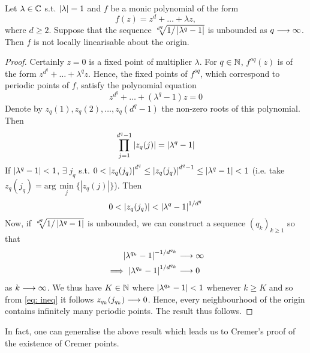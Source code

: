 \documentclass[../main.tex]{subfiles}
\begin{document}
\begin{lem}\label{Cremlem}
Let $\lambda \in \mathbb{C}$ s.t. $\left|\lambda\right| = 1$ and $f$ be a monic polynomial of the form
\[
f(z) = z^{d} + \dots + \lambda z,
\]
where $d \geq 2$.  Suppose that the sequence $\sqrt[d^{q}]{1 / \left|\lambda^q - 1\right|}$ is unbounded as $q \longrightarrow \infty$. Then $f$ is not locally linearisable about the origin.
\end{lem}
\begin{proof}
Certainly $z = 0$ is a fixed point of multiplier $\lambda$. For $q \in \mathbb{N}$, $f^{oq}(z)$ is of the form $z^{d^{q}} + \dots + \lambda^{q} z$. Hence, the fixed points of $f^{oq}$, which correspond to periodic points of $f$, satisfy the polynomial equation
\[
z^{d^{q}} + \dots + (\lambda^{q} - 1)z = 0
\]
Denote by $z_{q}(1), z_{q}(2), \dots, z_{q}(d^{q} - 1)$ the non-zero roots of this polynomial. Then 
\[
\prod_{j = 1}^{d^{q}-1} \left|{ z_{q}{(j)}}\right| = \left|\lambda^{q} - 1\right|
\]
If $\left|\lambda^{q} - 1\right| < 1$, $\exists\; j_{q}$\; s.t. $0 < \left|z_{q}(j_q)\right|^{d^{q}} \leq\left|z_{q}(j_q)\right|^{d^{q}-1} \leq \left|\lambda^{q} - 1\right| < 1$ (i.e. take $z_{q}(j_q) = \text{arg}\,\min\limits_{j}\{\left|z_{q}(j)\right|\}$). Then 
\begin{equation}\label{eq: ineq}
0 < \left| z_{q}(j_q) \right| < \left|\lambda^{q} - 1\right|^{1/d^{q}}
\end{equation}
Now, if $\sqrt[d^{q}]{1 / \left|\lambda^q - 1\right|}$ is unbounded, we can construct a sequence $(q_{k})_{k\geq 1}$ so that
\begin{align*}
\left|\lambda^{q_k} - 1\right|^{-1/d^{q_{k}}} &\longrightarrow \infty\\
\implies \left|\lambda^{q_k} - 1\right|^{1/d^{q_{k}}} &\longrightarrow 0
\end{align*}
as $k \longrightarrow \infty$. We thus have $K \in \mathbb{N}$ where $\left|\lambda^{q_k} - 1\right| < 1$ whenever $k \geq K$ and so from \eqref{eq: ineq} it follows $z_{q_{k}}(j_{q_{k}}) \longrightarrow 0$. Hence, every neighbourhood of the origin contains infinitely many periodic points. The result thus follows.
\end{proof}

In fact, one can generalise the above result which leads us to Cremer's proof of the existence of Cremer points.
\end{document}
